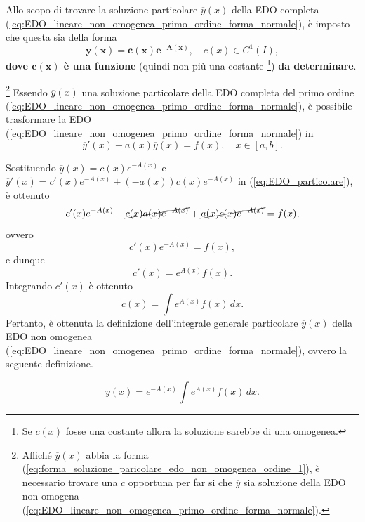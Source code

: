 Allo scopo di trovare la soluzione particolare $\overline y(x)$ della EDO completa (\ref{eq:EDO_lineare_non_omogenea_primo_ordine_forma_normale}), è imposto che questa sia della forma 
\begin{equation}\label{eq:forma_soluzione_paricolare_edo_non_omogenea_ordine_1}
    \boldsymbol{\overline{y}(x) = c(x)e^{-A(x)}},\quad c(x)\in C^1(I),
\end{equation}
\textbf{dove $\boldsymbol{c(x)}$ è una funzione} (quindi non più una costante \footnote{Se $c(x)$ fosse una costante allora la soluzione sarebbe di una omogenea.}) \textbf{da determinare}.

\footnote{Affiché $\overline{y}(x)$ abbia la forma (\ref{eq:forma_soluzione_paricolare_edo_non_omogenea_ordine_1}), è necessario trovare una $c$ opportuna per far si che $\overline{y}$ sia soluzione della EDO non omogena (\ref{eq:EDO_lineare_non_omogenea_primo_ordine_forma_normale}).} Essendo $\overline{y}(x)$ una soluzione particolare della EDO completa del primo ordine (\ref{eq:EDO_lineare_non_omogenea_primo_ordine_forma_normale}), è possibile trasformare la EDO (\ref{eq:EDO_lineare_non_omogenea_primo_ordine_forma_normale}) in 
\begin{equation}\label{eq:EDO_particolare}
    \overline{y}'(x)+a(x)\overline{y}(x)=f(x),\quad x\in[a,b].
\end{equation}

Sostituendo $\overline{y}(x)=c(x)e^{-A(x)}$ e $\overline{y}'(x) = c'(x)e^{-A(x)}+(-a(x))c(x)e^{-A(x)}$ in (\ref{eq:EDO_particolare}), è ottenuto
\begin{equation*}
    c'(x)e^{-A(x)}-\cancel{c(x)a(x)e^{-A(x)}}+\cancel{a(x)c(x)e^{-A(x)}}=f(x),
\end{equation*}
ovvero
\begin{equation*}
    c'(x)e^{-A(x)} = f(x),
\end{equation*}
e dunque
\begin{equation*}
    c'(x)=e^{A(x)}f(x).
\end{equation*}
Integrando $c'(x)$ è ottenuto
\begin{equation*}
    c(x)=\int e^{A(x)} f(x)\, dx.
\end{equation*}
Pertanto, è ottenuta la definizione dell'integrale generale particolare $\overline{y}(x)$ della EDO non omogenea (\ref{eq:EDO_lineare_non_omogenea_primo_ordine_forma_normale}), ovvero la seguente definizione.
\begin{definition}
    \begin{equation}\label{eq:integrale_particolare_EDO_completa}
        \overline{y}(x)=e^{-A(x)}\int e^{A(x)} f(x)\, dx.
    \end{equation}
\end{definition}


